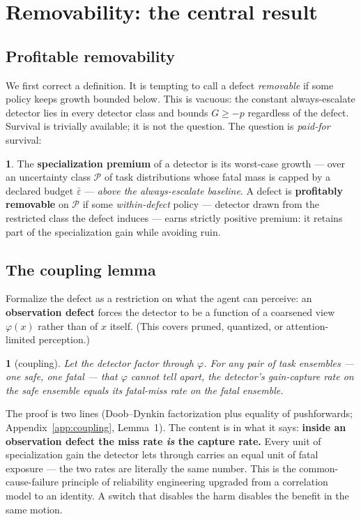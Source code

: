\documentclass[11pt]{article}
\theoremstyle{plain}
\newtheorem*{namedthminner}{\namedthmname}
\newenvironment{nthm}[1]{\def\namedthmname{#1}\begin{namedthminner}}{\end{namedthminner}}
\theoremstyle{definition}
\newtheorem*{nameddefinner}{\nameddefname}
\newenvironment{ndef}[1]{\def\nameddefname{#1}\begin{nameddefinner}}{\end{nameddefinner}}
\begin{document}
\section{Removability: the central result}\label{sec:removability}

\subsection{Profitable removability}\label{sec:profitable}

We first correct a definition. It is tempting to call a defect \emph{removable} if
some policy keeps growth bounded below. This is vacuous: the constant
always-escalate detector lies in every detector class and bounds $G \geq -p$
regardless of the defect. Survival is trivially available; it is not the
question. The question is \emph{paid-for} survival:

\begin{ndef}{Definition}
The \textbf{specialization premium} of a detector is its worst-case
growth --- over an uncertainty class $\mathcal{P}$ of task distributions whose
fatal mass is capped by a declared budget $\bar\varepsilon$ --- \emph{above the
always-escalate baseline}. A defect is \textbf{profitably removable} on
$\mathcal{P}$ if some \emph{within-defect} policy --- detector drawn from the
restricted class the defect induces --- earns strictly positive premium: it
retains part of the specialization gain while avoiding ruin.
\end{ndef}

\subsection{The coupling lemma}\label{sec:coupling}

Formalize the defect as a restriction on what the agent can perceive: an
\textbf{observation defect} forces the detector to be a function of a coarsened
view $\varphi(x)$ rather than of $x$ itself. (This covers pruned, quantized,
or attention-limited perception.)

\begin{nthm}{Lemma}[coupling]
Let the detector factor through $\varphi$. For any pair
of task ensembles --- one safe, one fatal --- that $\varphi$ cannot tell apart,
the detector's gain-capture rate on the safe ensemble equals its fatal-miss
rate on the fatal ensemble.
\end{nthm}

The proof is two lines (Doob--Dynkin factorization plus equality of
pushforwards; Appendix~\ref{app:coupling}, Lemma~1). The content is in what it says: \textbf{inside an
observation defect the miss rate \emph{is} the capture rate.} Every unit of
specialization gain the detector lets through carries an equal unit of fatal
exposure --- the two rates are literally the same number. This is the
common-cause-failure principle of reliability engineering \citep{eckhardt1985,littlewood2012} upgraded from a correlation model to an identity. A
switch that disables the harm disables the benefit in the same motion.
\end{document}

